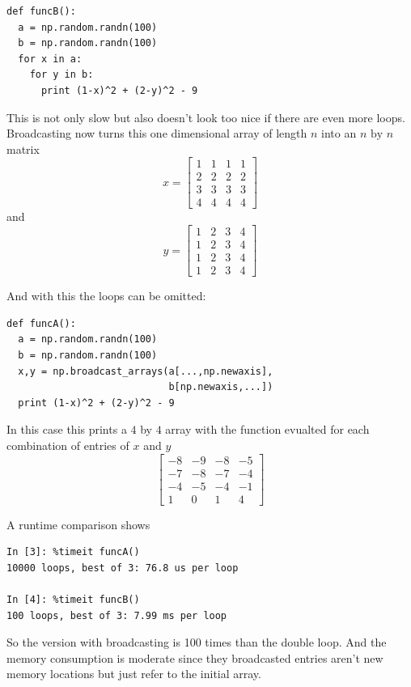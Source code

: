\documentclass[11pt,twoside]{scrreprt}
\begin{document}
\noindent\begin{minipage}{\linewidth}
\begin{lstlisting}
def funcB():
  a = np.random.randn(100)
  b = np.random.randn(100) 
  for x in a:
    for y in b:
      print (1-x)^2 + (2-y)^2 - 9
\end{lstlisting}  
\end{minipage}
%
This is not only slow but also doesn't look too nice if there are even more loops.
Broadcasting now turns this one dimensional array of length $n$ into an $n\text{ by }n$ matrix
\[
  x = \begin{bmatrix}
  1 & 1 & 1 & 1 \\
  2 & 2 & 2 & 2 \\
  3 & 3 & 3 & 3\\
  4 & 4 & 4 & 4
  \end{bmatrix}
\]
and
\[
  y = \begin{bmatrix}
  1 & 2 & 3 & 4 \\
  1 & 2 & 3 & 4 \\
  1 & 2 & 3 & 4 \\
  1 & 2 & 3 & 4 
\end{bmatrix}
\]
\noindent\begin{minipage}{\linewidth}
And with this the loops can be omitted:
\begin{lstlisting}
def funcA():
  a = np.random.randn(100)
  b = np.random.randn(100) 
  x,y = np.broadcast_arrays(a[...,np.newaxis],
                            b[np.newaxis,...])
  print (1-x)^2 + (2-y)^2 - 9
\end{lstlisting}  
\end{minipage}
In this case this prints a $4$ by $4$ array with the function evualted for each combination of entries of $x$ and $y$
\[
  \begin{bmatrix}
    -8& -9& -8& -5\\
    -7& -8& -7& -4\\
    -4& -5& -4& -1\\
     1&  0&  1&  4
       \end{bmatrix}
\]
%
\begin{minipage}{\linewidth}
A runtime comparison shows   
\begin{lstlisting}
In [3]: %timeit funcA()
10000 loops, best of 3: 76.8 us per loop

In [4]: %timeit funcB()
100 loops, best of 3: 7.99 ms per loop
\end{lstlisting}
So the version with broadcasting is 100 times than the double loop. And the memory consumption is moderate since they broadcasted entries aren't new memory locations but just refer to the initial array.
\end{minipage}
\end{document}
